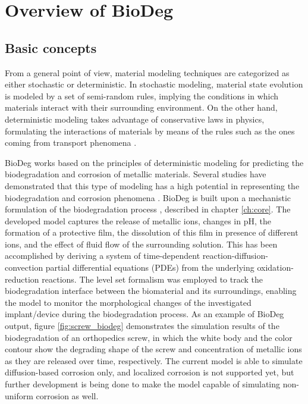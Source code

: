 \section{Overview of BioDeg}

\subsection{Basic concepts}

From a general point of view, material modeling techniques are categorized as either stochastic or deterministic. In stochastic modeling, material state evolution is modeled by a set of semi-random rules, implying the conditions in which materials interact with their surrounding environment. On the other hand, deterministic modeling takes advantage of conservative laws in physics, formulating the interactions of materials by means of the rules such as the ones coming from transport phenomena \cite{Kurtz1972}.

BioDeg works based on the principles of deterministic modeling for predicting the biodegradation and corrosion of metallic materials. Several studies have demonstrated that this type of modeling has a high potential in representing the biodegradation and corrosion phenomena \cite{Dolgikh2019, Bajger2016, SanzHerrera2018}. BioDeg is built upon a mechanistic formulation of the biodegradation process \cite{Barzegari2021}, described in chapter \ref{ch:core}. The developed model captures the release of metallic ions, changes in pH, the formation of a protective film, the dissolution of this film in presence of different ions, and the effect of fluid flow of the surrounding solution. This has been accomplished by deriving a system of time-dependent reaction-diffusion-convection partial differential equations (\gls{PDE}s) from the underlying oxidation-reduction reactions. The level set formalism \cite{RonaldFedkiw2002} was employed to track the biodegradation interface between the biomaterial and its surroundings, enabling the model to monitor the morphological changes of the investigated implant/device during the biodegradation process. As an example of BioDeg output, figure \ref{fig:screw_biodeg} demonstrates the simulation results of the biodegradation of an orthopedics screw, in which the white body and the color contour show the degrading shape of the screw and concentration of metallic ions as they are released over time, respectively. The current model is able to simulate diffusion-based corrosion only, and localized corrosion is not supported yet, but further development is being done to make the model capable of simulating non-uniform corrosion as well.

